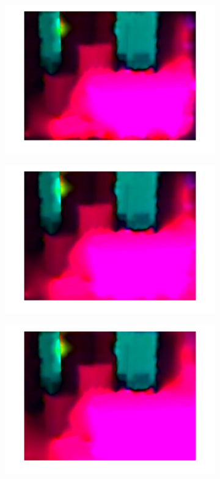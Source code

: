 \documentclass[10pt,twocolumn,letterpaper]{article}
\begin{document}
\begin{figure}
	\begin{subfigure}[b]{0.3\textwidth}
               \includegraphics[width=\textwidth] {urban2_3levels.jpg} \hfill
       \end{subfigure}
       \begin{subfigure}[b]{0.3\textwidth}
               \includegraphics[width=\textwidth] {urban2_5levels.jpg} \hfill
       \end{subfigure}
       \begin{subfigure}[b]{0.3\textwidth}
               \includegraphics[width=\textwidth] {urban2_9levels.jpg}

\end{subfigure}
\end{figure}
\end{document}
